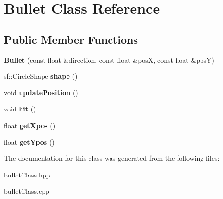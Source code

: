 \hypertarget{class_bullet}{}\section{Bullet Class Reference}
\label{class_bullet}
\subsection*{Public Member Functions}
\begin{DoxyCompactItemize}
\item 
\mbox{\label{class_bullet_a547fc8096100a421739341fe6527f9aa}} 
{\bfseries Bullet} (const float \&direction, const float \&posX, const float \&posY)
\item 
\mbox{\label{class_bullet_ac4c9309e2ccd7e96866b03faff9c234e}} 
sf\+::\+Circle\+Shape {\bfseries shape} ()
\item 
\mbox{\label{class_bullet_a681e89577456c5e1275891494a265a14}} 
void {\bfseries update\+Position} ()
\item 
\mbox{\label{class_bullet_aba7042fcbc51ba80b55cf7f5872fc406}} 
void {\bfseries hit} ()
\item 
\mbox{\label{class_bullet_a305720694c5f0abd359318890bd3d124}} 
float {\bfseries get\+Xpos} ()
\item 
\mbox{\label{class_bullet_a64b5dfa031f8e81e7b1a92e70b99bdf9}} 
float {\bfseries get\+Ypos} ()
\end{DoxyCompactItemize}


The documentation for this class was generated from the following files\+:\begin{DoxyCompactItemize}
\item 
bullet\+Class.\+hpp\item 
bullet\+Class.\+cpp\end{DoxyCompactItemize}
